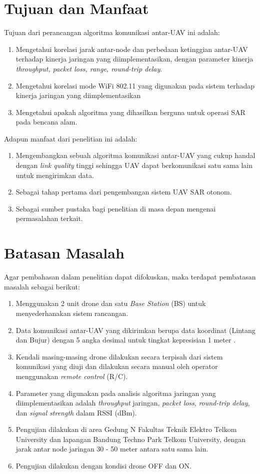 \section{Tujuan dan Manfaat}
Tujuan dari perancangan algoritma komunikasi antar-UAV ini adalah:
\begin{enumerate}
	\item Mengetahui korelasi jarak antar-node dan perbedaan ketinggian antar-UAV terhadap kinerja jaringan yang diimplementasikan, dengan parameter kinerja \textit{throughput, packet loss, range, round-trip delay}.
	\item Mengetahui korelasi mode WiFi 802.11 yang digunakan pada sistem terhadap kinerja jaringan yang diimplementasikan
	\item Mengetahui apakah algoritma yang dihasilkan berguna untuk operasi SAR pada bencana alam.
\end{enumerate}
Adapun manfaat dari penelitian ini adalah:
\begin{enumerate}
	\item Mengembangkan sebuah algoritma komunikasi antar-UAV yang cukup handal dengan \textit{link quality} tinggi sehingga UAV dapat berkomunikasi satu sama lain untuk mengirimkan data.
	\item Sebagai tahap pertama dari pengembangan sistem UAV SAR otonom.
	\item Sebagai sumber pustaka bagi penelitian di masa depan mengenai permasalahan terkait.
\end{enumerate}

\section{Batasan Masalah}
Agar pembahasan dalam penelitian dapat difokuskan, maka terdapat pembatasan masalah sebagai berikut:
\begin{enumerate}
	\item Menggunakan 2 unit drone dan satu \textit{Base Station} (BS) untuk menyederhanakan sistem rancangan.
	\item Data komunikasi antar-UAV yang dikirimkan berupa data koordinat (Lintang dan Bujur) dengan 5 angka desimal untuk tingkat kepresisian 1 meter \cite{PrecisionCoordinatesOpenStreetMap}.
	\item Kendali masing-masing drone dilakukan secara terpisah dari sistem komunikasi yang diuji dan dilakukan secara manual oleh operator menggunakan \textit{remote control} (R/C).
	\item Parameter yang digunakan pada analisis algoritma jaringan yang diimplementasikan adalah \textit{throughput} jaringan, \textit{packet loss},  \textit{round-trip delay}, dan \textit{signal strength} dalam RSSI (dBm).
	\item Pengujian dilakukan di area Gedung N Fakultas Teknik Elektro Telkom University dan lapangan Bandung Techno Park Telkom University, dengan jarak antar node jaringan 30 - 50 meter antara satu sama lain.
	\item Pengujian dilakukan dengan kondisi drone OFF dan ON.
\end{enumerate}

